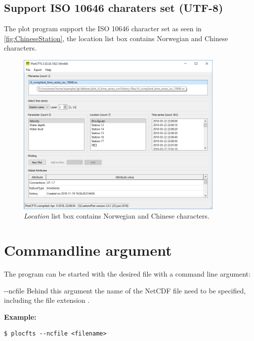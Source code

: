 \documentclass{deltares_memo}
\begin{document}
\subsection{Support ISO 10646 charaters set (UTF-8)}
The plot program support the ISO 10646 character set as seen in \autoref{fig:ChineseStation}, the location list box contains Norwegian and Chinese characters.
\begin{figure}[H]
    \centering    
    \includegraphics[width=0.9\textwidth]{pictures/plotcfts_with_chinese_karakters2.png}
    \caption{\emph{Location} list box contains Norwegian and Chinese characters. \label{fig:ChineseStation}}
\end{figure}

\section{Commandline argument}
The program can be started with the desired file with a command line argument:
\begin{symbollist}
    \item[{-{}-ncfile}] Behind this argument the name of the NetCDF file need to be specified, including the file extension .
\end{symbollist}
\textbf{Example:}
\begin{Verbatim}
$ plocfts --ncfile <filename>
\end{Verbatim}

\end{document}
